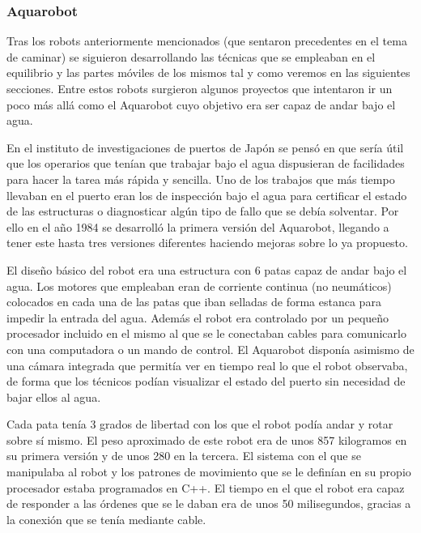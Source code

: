 \subsubsection{Aquarobot}
Tras los robots anteriormente mencionados (que sentaron precedentes en el tema de caminar) se siguieron desarrollando las técnicas que se empleaban en el equilibrio y las partes móviles de los mismos tal y como veremos en las siguientes secciones. Entre estos robots surgieron algunos proyectos que intentaron ir un poco más allá como el Aquarobot cuyo objetivo era ser capaz de andar bajo el agua.

\vspace{10px}

En el instituto de investigaciones de puertos de Japón se pensó en que sería útil que los operarios que tenían que trabajar bajo el agua dispusieran de facilidades para hacer la tarea más rápida y sencilla. Uno de los trabajos que más tiempo llevaban en el puerto eran los de inspección bajo el agua para certificar el estado de las estructuras o diagnosticar algún tipo de fallo que se debía solventar. Por ello en el año 1984 se desarrolló la primera versión del Aquarobot, llegando a tener este hasta tres versiones diferentes haciendo mejoras sobre lo ya propuesto.

\vspace{10px}

El diseño básico del robot era una estructura con 6 patas capaz de andar bajo el agua. Los motores que empleaban eran de corriente continua (no neumáticos) colocados en cada una de las patas que iban selladas de forma estanca para impedir la entrada del agua. Además el robot era controlado por un pequeño procesador incluido en el mismo al que se le conectaban cables para comunicarlo con una computadora o un mando de control. El Aquarobot disponía asimismo de una cámara integrada que permitía ver en tiempo real lo que el robot observaba, de forma que los técnicos podían visualizar el estado del puerto sin necesidad de bajar ellos al agua.

\vspace{10px}

Cada pata tenía 3 grados de libertad con los que el robot podía andar y rotar sobre sí mismo. El peso aproximado de este robot era de unos 857 kilogramos en su primera versión y de unos 280 en la tercera. El sistema con el que se manipulaba al robot y los patrones de movimiento que se le definían en su propio procesador estaba programados en C++. El tiempo en el que el robot era capaz de responder a las órdenes que se le daban era de unos 50 milisegundos, gracias a la conexión que se tenía mediante cable.

